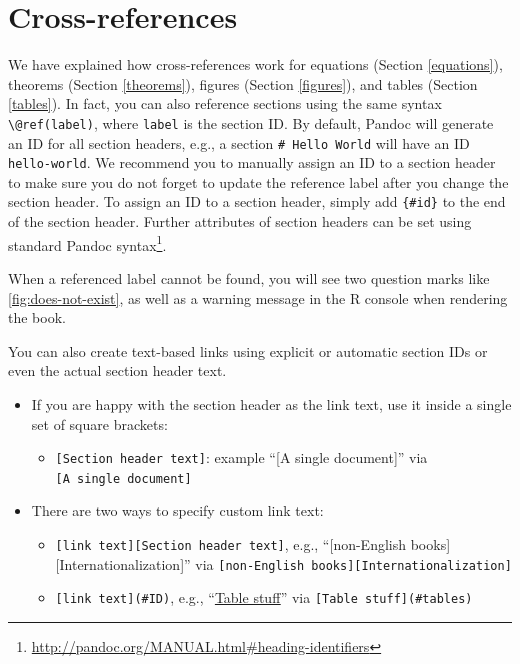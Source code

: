 \documentclass[
  12pt,
]{krantz}
\providecommand{\tightlist}{%
  \setlength{\itemsep}{0pt}\setlength{\parskip}{0pt}}
\renewcommand{\href}[2]{#2\footnote{\url{#1}}}
\theoremstyle{definition}
\theoremstyle{definition}
\theoremstyle{definition}
\theoremstyle{definition}
\theoremstyle{remark}
\begin{document}
\hypertarget{cross-references}{%
\section{Cross-references}\label{cross-references}}

We have explained how cross-references work for equations (Section \ref{equations}), theorems (Section \ref{theorems}), figures (Section \ref{figures}), and tables (Section \ref{tables}). In fact, you can also reference sections using the same syntax \texttt{\textbackslash{}@ref(label)}, where \texttt{label} is the section ID. By default, Pandoc will generate an ID for all section headers, e.g., a section \texttt{\#\ Hello\ World} will have an ID \texttt{hello-world}. We recommend you to manually assign an ID to a section header to make sure you do not forget to update the reference label after you change the section header. To assign an ID to a section header, simply add \texttt{\{\#id\}} to the end of the section header. Further attributes of section headers can be set using standard \href{http://pandoc.org/MANUAL.html\#heading-identifiers}{Pandoc syntax}.

When a referenced label cannot be found, you will see two question marks like \ref{fig:does-not-exist}, as well as a warning message in the R console when rendering the book.

You can also create text-based links using explicit or automatic section IDs or even the actual section header text.

\begin{itemize}
\tightlist
\item
  If you are happy with the section header as the link text, use it inside a single set of square brackets:

  \begin{itemize}
  \tightlist
  \item
    \texttt{{[}Section\ header\ text{]}}: example ``{[}A single document{]}'' via \texttt{{[}A\ single\ document{]}}
  \end{itemize}
\item
  There are two ways to specify custom link text:

  \begin{itemize}
  \tightlist
  \item
    \texttt{{[}link\ text{]}{[}Section\ header\ text{]}}, e.g., ``{[}non-English books{]}{[}Internationalization{]}'' via \texttt{{[}non-English\ books{]}{[}Internationalization{]}}
  \item
    \texttt{{[}link\ text{]}(\#ID)}, e.g., ``\protect\hyperlink{tables}{Table stuff}'' via \texttt{{[}Table\ stuff{]}(\#tables)}
  \end{itemize}
\end{itemize}
\end{document}
